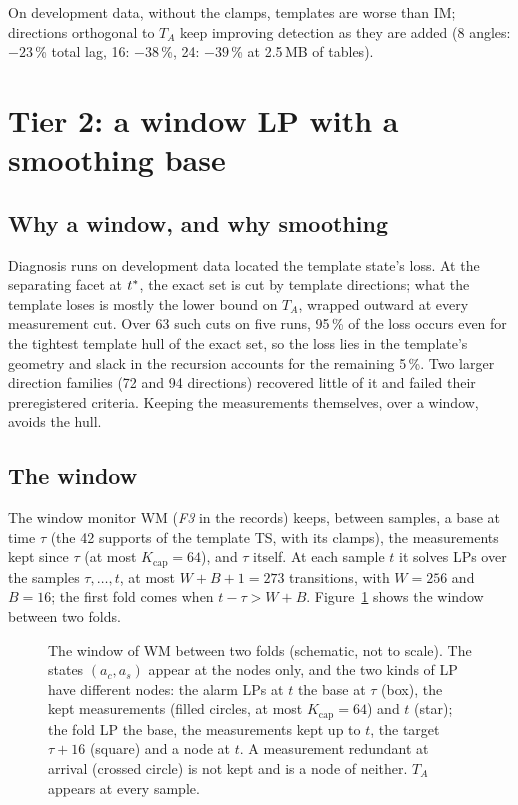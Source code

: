 On development data, without the clamps, templates are worse than IM; directions orthogonal to $T_A$ keep improving
detection as they are added (8 angles: $-23$\,\% total lag, 16: $-38$\,\%, 24: $-39$\,\% at 2.5\,MB of tables).

\section{Tier 2: a window LP with a smoothing base}

\subsection{Why a window, and why smoothing}\label{sec:whywindow}

Diagnosis runs on development data located the template state's loss. At the separating facet at $t^{\ast}$, the exact
set is cut by template directions; what the template loses is mostly the lower bound on $T_A$, wrapped outward at every
measurement cut. Over 63 such cuts on five runs, 95\,\% of the loss occurs even for the tightest template hull of the
exact set, so the loss lies in the template's geometry and slack in the recursion accounts for the remaining 5\,\%. Two
larger direction families (72 and 94 directions) recovered little of it and failed their preregistered criteria.
Keeping the measurements themselves, over a window, avoids the hull.

\subsection{The window}\label{sec:window}

The window monitor WM (\emph{F3} in the records) keeps, between samples, a base at time $\tau$ (the 42 supports of the
template TS, with its clamps), the measurements kept since $\tau$ (at most $K_{\mathrm{cap}} = 64$), and $\tau$ itself.
At each sample $t$ it solves LPs over the samples $\tau,\dots,t$, at most $W+B+1 = 273$ transitions, with $W = 256$
and $B = 16$; the first fold comes when $t-\tau > W+B$. Figure~\ref{fig:window} shows the window between two folds.

\begin{figure}[t]
\centering

\caption{The window of WM between two folds (schematic, not to scale). The states $(a_c, a_s)$ appear at the nodes
only, and the two kinds of LP have different nodes: the alarm LPs at $t$ the base at $\tau$ (box), the kept
measurements (filled circles, at most $K_{\mathrm{cap}} = 64$) and $t$ (star); the fold LP the base, the measurements
kept up to $t$, the target $\tau+16$ (square) and a node at $t$. A measurement redundant at arrival (crossed circle) is not kept and
is a node of neither. $T_A$ appears at every sample.}
\label{fig:window}
\end{figure}

